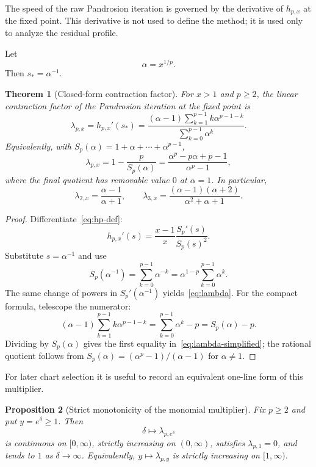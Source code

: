 \documentclass[10pt,a4paper]{article}
\theoremstyle{plain}
\newtheorem{theorem}{Theorem}[section]
\newtheorem{proposition}[theorem]{Proposition}
\theoremstyle{definition}
\theoremstyle{remark}
\newcommand{\Sp}{S_p}
\newcommand{\hp}{h_{p,x}}
\begin{document}
The speed of the raw Pandrosion iteration is governed by the derivative of
$\hp$ at the fixed point.  This derivative is not used to define the method; it
is used only to analyze the residual profile.

Let
\[
  \alpha=x^{1/p}.
\]
Then $s_*=\alpha^{-1}$.

\begin{theorem}[Closed-form contraction factor]
\label{thm:lambda}
For $x>1$ and $p\ge2$, the linear contraction factor of the Pandrosion
iteration at the fixed point is
\begin{equation}
  \lambda_{p,x}=\hp'(s_*)
  =\frac{(\alpha-1)\sum_{k=1}^{p-1}k\alpha^{p-1-k}}
         {\sum_{k=0}^{p-1}\alpha^k}.
  \label{eq:lambda}
\end{equation}
Equivalently, with $S_p(\alpha)=1+\alpha+\cdots+\alpha^{p-1}$,
\begin{equation}
  \lambda_{p,x}
  =1-\frac{p}{S_p(\alpha)}
  =\frac{\alpha^p-p\alpha+p-1}{\alpha^p-1},
  \label{eq:lambda-simplified}
\end{equation}
where the final quotient has removable value $0$ at $\alpha=1$.  In particular,
\[
  \lambda_{2,x}=\frac{\alpha-1}{\alpha+1},
  \qquad
  \lambda_{3,x}=\frac{(\alpha-1)(\alpha+2)}{\alpha^2+\alpha+1}.
\]
\end{theorem}

\begin{proof}
Differentiate~\eqref{eq:hp-def}:
\[
  \hp'(s)=\frac{x-1}{x}\frac{\Sp'(s)}{\Sp(s)^2}.
\]
Substitute $s=\alpha^{-1}$ and use
\[
  \Sp(\alpha^{-1})
  =\sum_{k=0}^{p-1}\alpha^{-k}
  =\alpha^{1-p}\sum_{k=0}^{p-1}\alpha^k.
\]
The same change of powers in $\Sp'(\alpha^{-1})$ yields~\eqref{eq:lambda}.
For the compact formula, telescope the numerator:
\[
  (\alpha-1)\sum_{k=1}^{p-1}k\alpha^{p-1-k}
  =\sum_{k=0}^{p-1}\alpha^k-p
  =S_p(\alpha)-p.
\]
Dividing by $S_p(\alpha)$ gives the first equality in~\eqref{eq:lambda-simplified};
the rational quotient follows from
$S_p(\alpha)=(\alpha^p-1)/(\alpha-1)$ for $\alpha\ne1$.
\end{proof}




For later chart selection it is useful to record an equivalent one-line form of
this multiplier.

\begin{proposition}[Strict monotonicity of the monomial multiplier]
\label{prop:lambda-monotone}
Fix $p\ge2$ and put $y=e^\delta\ge1$.  Then
\[
  \delta\longmapsto \lambda_{p,e^\delta}
\]
is continuous on $[0,\infty)$, strictly increasing on $(0,\infty)$, satisfies
$\lambda_{p,1}=0$, and tends to $1$ as $\delta\to\infty$.  Equivalently,
$y\mapsto\lambda_{p,y}$ is strictly increasing on $[1,\infty)$.
\end{proposition}
\end{document}
